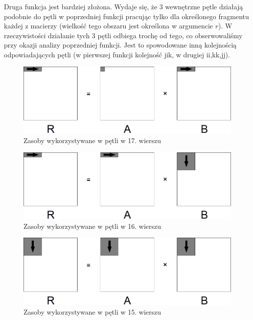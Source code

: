 \documentclass{article}
\begin{document}
Druga funkcja jest bardziej złożona. Wydaje się, że 3 wewnętrzne pętle działają podobnie do pętli w poprzedniej funkcji pracując tylko dla określonego fragmentu każdej z macierzy (wielkość tego obszaru jest określona w argumencie $r$). W rzeczywistości działanie tych 3 pętli odbiega trochę od tego, co obserwowaliśmy przy okazji analizy poprzedniej funkcji. Jest to spowodowane inną kolejnością odpowiadających pętli (w pierwszej funkcji kolejność jik, w drugiej ii,kk,jj).

\begin{figure}[H]
	\centering
	\includegraphics[width=\linewidth]{./images/6/lokIn1.png}
	\caption{Zasoby wykorzystywane w pętli w 17. wierszu}
	\label{fig:6inner1}
\end{figure}

\begin{figure}[H]
	\centering
	\includegraphics[width=\linewidth]{./images/6/lokIn2.png}
	\caption{Zasoby wykorzystywane w pętli w 16. wierszu}
	\label{fig:6inner2}
\end{figure}

\begin{figure}[H]
	\centering
	\includegraphics[width=\linewidth]{./images/6/lokIn3.png}
	\caption{Zasoby wykorzystywane w pętli w 15. wierszu}
	\label{fig:6inner3}
\end{figure}
\end{document}
